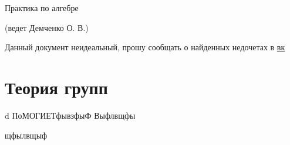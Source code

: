 \documentclass[11pt]{article}
\begin{document}
\begin{center}
  \huge Практика по алгебре
  
  (ведет Демченко О. В.)
\end{center}
Данный документ неидеальный, прошу сообщать о найденных недочетах в \href{https://vk.com/drab_existence_a}{вк}
\tableofcontents
\newpage

\section{Теория групп}

\begin{statement}
 d ПоМОГИЕТфывзфыФ
Выфлвщфы


щфылвщыф
\end{statement}
\end{document}

